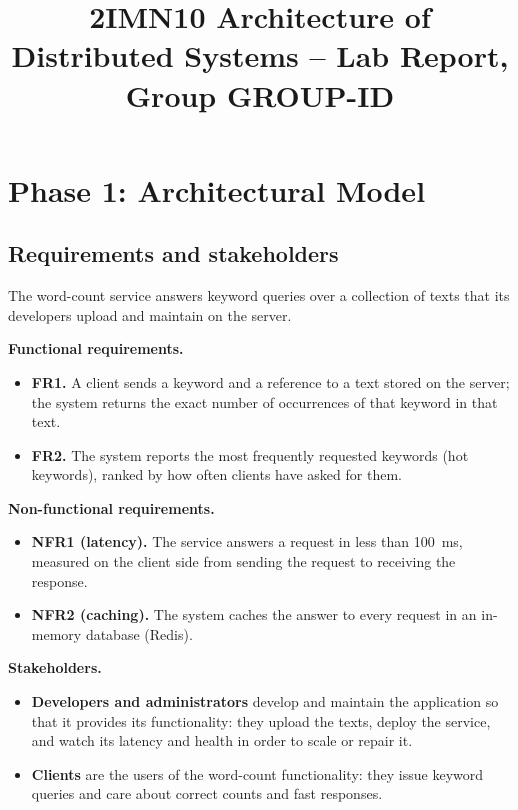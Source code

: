 \documentclass[conference,onecolumn]{IEEEtran}
\begin{document}
\title{2IMN10 Architecture of Distributed Systems -- Lab Report, Group GROUP-ID}

\author{
\and
{}
\and
{}
}

\maketitle

\section{Phase 1: Architectural Model}

\subsection{Requirements and stakeholders}

The word-count service answers keyword queries over a collection of texts that its developers upload and maintain on the server.

\textbf{Functional requirements.}
\begin{itemize}
  \item \textbf{FR1.} A client sends a keyword and a reference to a text stored on the server; the system returns the exact number of occurrences of that keyword in that text.
  \item \textbf{FR2.} The system reports the most frequently requested keywords (hot keywords), ranked by how often clients have asked for them.
\end{itemize}

\textbf{Non-functional requirements.}
\begin{itemize}
  \item \textbf{NFR1 (latency).} The service answers a request in less than 100~ms, measured on the client side from sending the request to receiving the response.
  \item \textbf{NFR2 (caching).} The system caches the answer to every request in an in-memory database (Redis).
\end{itemize}

\textbf{Stakeholders.}
\begin{itemize}
  \item \textbf{Developers and administrators} develop and maintain the application so that it provides its functionality: they upload the texts, deploy the service, and watch its latency and health in order to scale or repair it.
  \item \textbf{Clients} are the users of the word-count functionality: they issue keyword queries and care about correct counts and fast responses.
\end{itemize}
\end{document}
